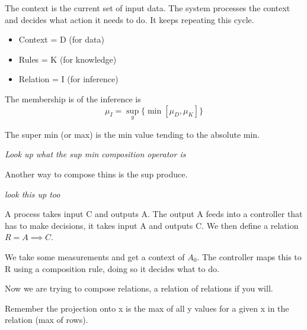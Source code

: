 \documentclass{article}
\begin{document}


The context is the current set of input data. The system processes the context and decides what action it needs to do. It keeps repeating this cycle.
\begin{itemize}
	\item Context = D (for data)
	\item Rules = K (for knowledge)
	\item Relation = I (for inference)
\end{itemize}

The membership is of the inference is
\begin{equation}
	\mu_I = \sup_y\{\min[\mu_D, \mu_K]\}
\end{equation}

The super min (or max) is the min value tending to the absolute min.

\emph{Look up what the sup min composition operator is}

Another way to compose thins is the sup produce.

\emph{look this up too}


A process takes input C and outputs A. The output A feeds into a controller that has to make decisions, it takes input A and outputs C. We then define a relation $R=A\implies C$.

We take some measurements and get a context of $A_0$. The controller maps this to R using a composition rule, doing so it decides what to do.


Now we are trying to compose relations, a relation of relations if you will.


Remember the projection onto x is the max of all y values for a given x in the relation (max of rows).


\end{document}
